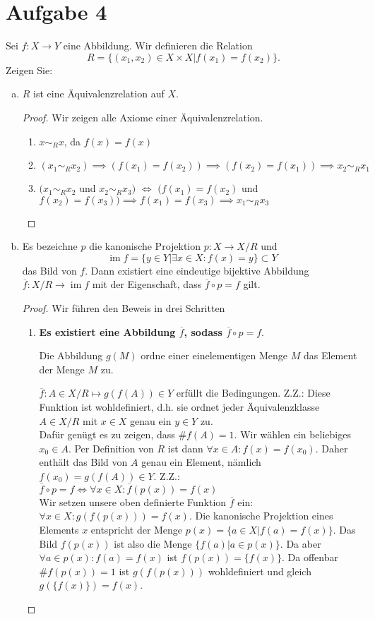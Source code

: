 \documentclass{article}
\begin{document}
	\section*{Aufgabe 4}
	Sei $f : X \to Y$ eine Abbildung. Wir definieren die Relation
	\[R = \{(x_1 , x_2) \in X \times  X | f(x_1) = f(x_2)\}.\]
	Zeigen Sie:
	\begin{enumerate}[a)]
		\item $R$ ist eine Äquivalenzrelation auf $X$.
		\begin{proof} Wir zeigen alle Axiome einer Äquivalenzrelation.
			\begin{enumerate}[Ä1)]
				\item $x\sim_R x$, da $f(x) = f(x)$
				\item $(x_1 \sim_R x_2) \implies (f(x_1) = f(x_2))\implies (f(x_2) = f(x_1))\implies x_2\sim_R x_1$
				\item $(x_1 \sim_R x_2$ und $x_2 \sim_R x_3)$ $\Leftrightarrow$ $(f(x_1) = f(x_2)$ und $f(x_2) = f(x_3)) \implies f(x_1) = f(x_3) \implies x_1\sim_R x_3$
			\end{enumerate}
		\end{proof}
	\newpage
		\item Es bezeichne $p$ die kanonische Projektion $p : X \to X/R$ und
		\[\operatorname{im} f = \{y \in  Y | \exists x \in X: f(x) = y\}\subset Y\]
		das Bild von $f$. Dann existiert eine eindeutige bijektive Abbildung $\overline{f}: X/R \to \operatorname{im} f$ mit der Eigenschaft, dass $\overline{f} \circ p = f$ gilt.
		\begin{proof}Wir führen den Beweis in drei Schritten
			\begin{enumerate}[1)]
				\item \textbf{Es existiert eine Abbildung $\overline{f}$, sodass $\overline{f} \circ p = f$}.\\ 
				\begin{definition}
					Die Abbildung $g(M)$ ordne einer einelementigen Menge $M$ das Element der Menge $M$ zu.
				\end{definition}
				$\overline{f}: A\in X/R\mapsto g(f(A)) \in Y$ erfüllt die Bedingungen.
				Z.Z.: Diese Funktion ist wohldefiniert, d.h. sie ordnet jeder Äquivalenzklasse $A\in X/R$ mit $x\in X$ genau ein $y\in Y$ zu.\\
				Dafür genügt es zu zeigen, dass $\#f(A) = 1$. Wir wählen ein beliebiges $x_0 \in A$. Per Definition von $R$ ist dann $\forall x\in A: f(x) = f(x_0)$. Daher enthält das Bild von $A$ genau ein Element, nämlich $ f(x_0) = g(f(A))\in Y$.
				Z.Z.: $\overline{f} \circ p = f \Leftrightarrow \forall x\in X: \overline{f}(p(x)) = f(x)$\\
				Wir setzen unsere oben definierte Funktion $\overline{f}$ ein: $\forall x\in X: g(f(p(x))) = f(x)$. Die kanonische Projektion eines Elements $x$ entspricht der Menge $p(x) = \{a\in X|f(a)=f(x)\}$. Das Bild $f(p(x))$ ist also die Menge $\{f(a)|a \in p(x)\}$. Da aber $\forall a\in p(x): f(a) = f(x)$ ist $f(p(x)) = \{f(x)\}$. Da offenbar $\#f(p(x)) = 1$ ist $g(f(p(x)))$ wohldefiniert und gleich $g(\{f(x)\}) = f(x)$.
				

\end{enumerate}
\end{proof}
\end{enumerate}
\end{document}
